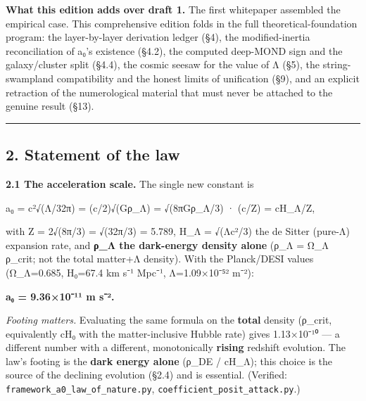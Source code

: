 \documentclass[
]{article}
\begin{document}
\textbf{What this edition adds over draft 1.} The first whitepaper
assembled the empirical case. This comprehensive edition folds in the
full theoretical-foundation program: the layer-by-layer derivation
ledger (§4), the modified-inertia reconciliation of a₀'s existence
(§4.2), the computed deep-MOND sign and the galaxy/cluster split (§4.4),
the cosmic seesaw for the value of Λ (§5), the string-swampland
compatibility and the honest limits of unification (§9), and an explicit
retraction of the numerological material that must never be attached to
the genuine result (§13).

\begin{center}\rule{0.5\linewidth}{0.5pt}\end{center}

\subsection{2. Statement of the law}\label{statement-of-the-law}

\textbf{2.1 The acceleration scale.} The single new constant is

a₀ = c²√(Λ/32π) = (c/2)√(Gρ\_Λ) = √(8πGρ\_Λ/3) · (c/Z) = cH\_Λ/Z,

with Z = 2√(8π/3) = √(32π/3) = 5.789, H\_Λ = √(Λc²/3) the de Sitter
(pure-Λ) expansion rate, and \textbf{ρ\_Λ the dark-energy density alone}
(ρ\_Λ = Ω\_Λ ρ\_crit; not the total matter+Λ density). With the
Planck/DESI values (Ω\_Λ=0.685, H₀=67.4 km s⁻¹ Mpc⁻¹, Λ=1.09×10⁻⁵² m⁻²):

\textbf{a₀ = 9.36×10⁻¹¹ m s⁻².}

\emph{Footing matters.} Evaluating the same formula on the
\textbf{total} density (ρ\_crit, equivalently cH₀ with the
matter-inclusive Hubble rate) gives 1.13×10⁻¹⁰ --- a different number
with a different, monotonically \textbf{rising} redshift evolution. The
law's footing is the \textbf{dark energy alone} (ρ\_DE / cH\_Λ); this
choice is the source of the declining evolution (§2.4) and is essential.
(Verified: \texttt{framework\_a0\_law\_of\_nature.py},
\texttt{coefficient\_posit\_attack.py}.)
\end{document}
